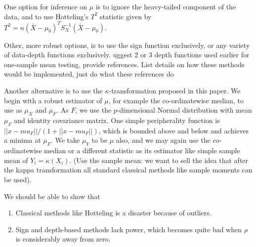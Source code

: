 \documentclass[12pt,letterpaper]{article}
\def\bredbf#1\eredbf{{\color{red}{\bf ???? #1 ????}}}
\theoremstyle{Example}
\begin{document}
One option for inference on $\mu$ is to ignore the heavy-tailed component of 
the data, and to use Hotteling's $T^{2}$ statistic given by 
$T^{2} = n (\bar{X} - \mu_{0})^{T} S_{X}^{-1} (\bar{X} - \mu_{0})$. 

Other, more robust options, is to use the sign function exclusively, 
or any variety of data-depth functions exclusively. 
\bredbf suggest 2 or 3 depth functions used earlier for one-sample mean 
testing, provide references. List details on how these methods would be implemented,
just do what these references do
 \eredbf

Another alternative is to use the $\kappa$-transformation proposed in this paper. 
We begin with a robust estimator of $\mu$, for example the co-ordinatewise median, 
to use as $\mu_{X}$ and $\mu_{F}$. As $F$, we use the $p$-dimensional Normal 
distribution with mean $\mu_{F}$ and identity covariance matrix. One simple
peripherality function is $ || x - mu_{F} ||/ (1 + || x - mu_{F} ||)$, which 
is bounded above and below and achieves a minima at $\mu_{F}$. We take $\mu_{Y}$ 
to be $\mu$ also, and we may again use the co-ordinatewise median or a different 
statistic as its estimator like simple sample mean of $Y_{i} = \kappa (X_{i})$.
(Use the sample mean: we want to sell the idea that after the kappa transformation 
all standard classical methods like sample moments can be used).


We should be able to show that 
\begin{enumerate}

\item Classical methods like Hotteling is a disaster because of outliers.

\item Sign and depth-based methods lack power, which becomes quite bad when $\rho$ 
is considerably away from zero.


\end{enumerate}
\end{document}
